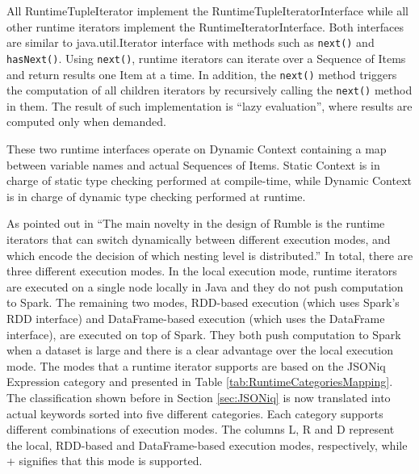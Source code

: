 All RuntimeTupleIterator implement the RuntimeTupleIteratorInterface while all other runtime iterators implement the RuntimeIteratorInterface. Both interfaces are similar to java.util.Iterator interface with methods such as \texttt{next()} and \texttt{hasNext()}. Using \texttt{next()}, runtime iterators can iterate over a Sequence of Items and return results one Item at a time. In addition, the \texttt{next()} method triggers the computation of all children iterators by recursively calling the \texttt{next()} method in them. The result of such implementation is ``lazy evaluation'', where results are computed only when demanded. 

These two runtime interfaces operate on Dynamic Context containing a map between variable names and actual Sequences of Items. Static Context is in charge of static type checking performed at compile-time, while Dynamic Context is in charge of dynamic type checking performed at runtime.

As pointed out in \cite{RumblePaper} ``The main novelty in the design of Rumble is the runtime iterators that can switch dynamically between different execution modes, and which encode the decision of which nesting level is distributed.'' In total, there are three different execution modes. In the local execution mode, runtime iterators are executed on a single node locally in Java and they do not push computation to Spark. The remaining two modes, RDD-based execution (which uses Spark’s RDD interface) and  DataFrame-based execution (which uses the DataFrame interface), are executed on top of Spark. They both push computation to Spark when a dataset is large and there is a clear advantage over the local execution mode. The modes that a runtime iterator supports are based on the JSONiq Expression category and presented in Table \ref{tab:RuntimeCategoriesMapping}. The classification shown before in Section \ref{sec:JSONiq} is now translated into actual keywords sorted into five different categories. Each category supports different combinations of execution modes. The columns L, R and D represent the local, RDD-based and DataFrame-based execution modes, respectively, while + signifies that this mode is supported.

